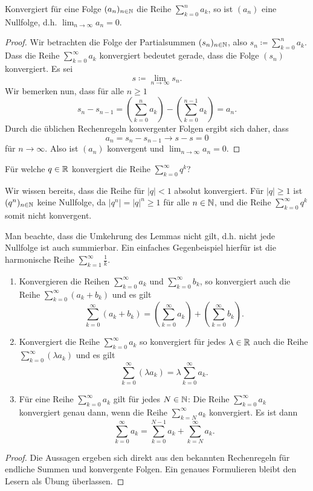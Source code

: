 \documentclass[a4paper,10pt]{article}
\begin{document}
\begin{lem}\label{lem: Reihe bedeutet Nullfolge}
 Konvergiert für eine Folge $(a_n)_{n \in \mathbb{N}}$ die Reihe $\sum_{k=0}^n a_k$, so ist $(a_n)$ eine Nullfolge, d.h. $\lim_{n \to \infty} a_n = 0$.
\end{lem}
\begin{proof}
 Wir betrachten die Folge der Partialsummen $(s_n)_{n \in \mathbb{N}}$, also $s_n \coloneqq \sum_{k=0}^n a_k$. Dass die Reihe $\sum_{k=0}^\infty a_k$ konvergiert bedeutet gerade, dass die Folge $(s_n)$ konvergiert. Es sei
 \[
  s \coloneqq \lim_{n \to \infty} s_n.
 \]
 Wir bemerken nun, dass für alle $n \geq 1$
 \[
  s_n - s_{n-1}
  = \left( \sum_{k=0}^n a_k \right) - \left( \sum_{k=0}^{n-1} a_k \right)
  = a_n.
 \]
 Durch die üblichen Rechenregeln konvergenter Folgen ergibt sich daher, dass
 \[
  a_n = s_n - s_{n-1} \to s-s = 0
 \]
 für $n \to \infty$. Also ist $(a_n)$ konvergent und $\lim_{n \to \infty} a_n = 0$.
\end{proof}

\begin{question}
 Für welche $q \in \mathbb{R}$ konvergiert die Reihe $\sum_{k=0}^\infty q^k$?
\end{question}
\begin{solution}
 Wir wissen bereits, dass die Reihe für $|q| < 1$ absolut konvergiert. Für $|q| \geq 1$ ist $(q^n)_{n \in \mathbb{N}}$ keine Nullfolge, da $|q^n| = |q|^n \geq 1$ für alle $n \in \mathbb{N}$, und die Reihe $\sum_{k=0}^\infty q^k$ somit nicht konvergent.
\end{solution}


Man beachte, dass die Umkehrung des Lemmas nicht gilt, d.h. nicht jede Nullfolge ist auch summierbar. Ein einfaches Gegenbeispiel hierfür ist die harmonische Reihe $\sum_{k=1}^\infty \frac{1}{k}$.


\begin{prop}
 \begin{enumerate}
  \item
   Konvergieren die Reihen $\sum_{k=0}^\infty a_k$ und $\sum_{k=0}^\infty b_k$, so konvergiert auch die Reihe $\sum_{k=0}^\infty (a_k + b_k)$ und es gilt
   \[
    \sum_{k=0}^\infty (a_k + b_k) = \left( \sum_{k=0}^\infty a_k \right) + \left( \sum_{k=0}^\infty b_k \right).
   \]
  \item
   Konvergiert die Reihe $\sum_{k=0}^\infty a_k$ so konvergiert für jedes $\lambda \in \mathbb{R}$ auch die Reihe $\sum_{k=0}^\infty (\lambda a_k)$ und es gilt
   \[
    \sum_{k=0}^\infty (\lambda a_k) = \lambda \sum_{k=0}^\infty a_k.
   \]
  \item
   Für eine Reihe $\sum_{k=0}^\infty a_k$ gilt für jedes $N \in \mathbb{N}$: Die Reihe $\sum_{k=0}^\infty a_k$ konvergiert genau dann, wenn die Reihe $\sum_{k=N}^\infty a_k$ konvergiert. Es ist dann
   \[
    \sum_{k=0}^\infty a_k = \sum_{k=0}^{N-1} a_k + \sum_{k=N}^\infty a_k.
   \]
 \end{enumerate}
\end{prop}
\begin{proof}
 Die Aussagen ergeben sich direkt aus den bekannten Rechenregeln für endliche Summen und konvergente Folgen. Ein genaues Formulieren bleibt den Lesern als Übung überlassen.
\end{proof}
\end{document}
